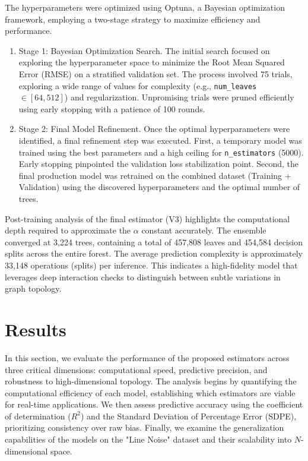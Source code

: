 \documentclass{article}
\begin{document}
The hyperparameters were optimized using Optuna, a Bayesian optimization framework, employing a two-stage strategy to maximize efficiency and performance.

\begin{enumerate}
    \item Stage 1: Bayesian Optimization Search. The initial search focused on exploring the hyperparameter space to minimize the Root Mean Squared Error (RMSE) on a stratified validation set. The process involved 75 trials, exploring a wide range of values for complexity (e.g., \texttt{num\_leaves} $\in [64, 512]$) and regularization. Unpromising trials were pruned efficiently using early stopping with a patience of 100 rounds.
    \item Stage 2: Final Model Refinement. Once the optimal hyperparameters were identified, a final refinement step was executed. First, a temporary model was trained using the best parameters and a high ceiling for \texttt{n\_estimators} (5000). Early stopping pinpointed the validation loss stabilization point. Second, the final production model was retrained on the combined dataset (Training + Validation) using the discovered hyperparameters and the optimal number of trees.
\end{enumerate}

Post-training analysis of the final estimator (V3) highlights the computational depth required to approximate the $\alpha$ constant accurately. The ensemble converged at 3,224 trees, containing a total of 457,808 leaves and 454,584 decision splits across the entire forest. The average prediction complexity is approximately 33,148\textbf{ }operations (splits) per inference. This indicates a high-fidelity model that leverages deep interaction checks to distinguish between subtle variations in graph topology.


\section{Results}
\label{sec:results}
In this section, we evaluate the performance of the proposed estimators across three critical dimensions: computational speed, predictive precision, and robustness to high-dimensional topology. The analysis begins by quantifying the computational efficiency of each model, establishing which estimators are viable for real-time applications. We then assess predictive accuracy using the coefficient of determination ($R^2$) and the Standard Deviation of Percentage Error (SDPE), prioritizing consistency over raw bias. Finally, we examine the generalization capabilities of the models on the  "Line Noise" dataset and their scalability into $N$-dimensional space.
\end{document}
